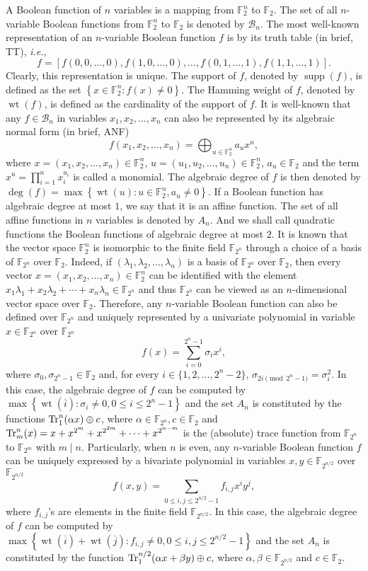 \documentclass{article}
\newcommand{\F}{\mathbb{F}}
\newcommand{\0}{\textbf{0}}
\newcommand{\1}{\textbf{1}}
\newcommand{\wt}{\operatorname{wt}}
\theoremstyle{plain}
\begin{document}
    A Boolean function of $n$ variables is a mapping from $\F_2^n$ to $\F_2$.
    The set of all $n$-variable Boolean functions from $\F_2^n$ to $\F_2$ is denoted by $\mathcal{B}_n$.
    The most well-known representation of an $n$-variable Boolean function $f$ is by its truth table (in brief, TT), \emph{i.e.},
    \[f=\left[ f(0,0,\dots,0),f(1,0,\dots,0),\dots,f(0,1,\dots,1),f(1,1,\dots,1) \right].\]
    Clearly, this representation is unique.
    The support of $f$, denoted by $\operatorname{supp}(f)$, is defined as the set $\left\{ x\in\F_2^n : f(x)\ne 0 \right\}$.
    The Hamming weight of $f$, denoted by $\wt(f)$, is defined as the cardinality of the support of $f$.
    It is well-known that any $f\in\mathcal{B}_n$ in variables $x_1,x_2,\dots,x_n$ can also be represented by its algebraic normal form (in brief, ANF)
    \[f(x_1,x_2,\dots,x_n) = \bigoplus_{u\in\F_2^n}a_ux^u,\]
    where $x=(x_1,x_2,\dots,x_n)\in\F_2^n$, $u=(u_1,u_2,\dots,u_n)\in\F_2^n$, $a_u\in\F_2$ and the term $x^{u}=\prod_{i=1}^nx_i^{u_i}$ is called a monomial.
    The algebraic degree of $f$ is then denoted by $\deg(f)=\max\left\{ \wt(u) :  u\in\F_2^n, a_u\ne 0 \right\}$.
    If a Boolean function has algebraic degree at most $1$, we say that it is an affine function.
    The set of all affine functions in $n$ variables is denoted by $A_n$.
    And we shall call quadratic functions the Boolean functions of algebraic degree at most $2$.
    It is known that the vector space $\F_2^n$ is isomorphic to the finite field $\F_{2^n}$ through a choice of a basis of $\F_{2^n}$ over $\F_2$.
    Indeed, if $(\lambda_1,\lambda_2,\dots,\lambda_n)$ is a basis of $\F_{2^n}$ over $\F_2$, then every vector $x=(x_1,x_2,\dots,x_n)\in\F_2^n$ can be
    identified with the element $x_1\lambda_1+x_2\lambda_2+\cdots+x_n\lambda_n\in\F_{2^n}$ and thus $\F_{2^n}$ can be viewed as an $n$-dimensional vector space over $\F_2$.
    Therefore, any $n$-variable Boolean function can also be defined over $\F_{2^n}$ and uniquely represented by a univariate polynomial in variable $x\in\F_{2^n}$ over $\F_{2^n}$
    \[f(x) = \sum_{i=0}^{2^n-1}\sigma_ix^i,\]
    where $\sigma_0,\sigma_{2^n-1}\in\F_2$ and, for every $i\in\{1,2,\dots,2^n-2\}$, $\sigma_{2i\pmod{2^n-1}}=\sigma_i^2$.
    In this case, the algebraic degree of $f$ can be computed by $\max\left\{ \wt(\overline{i}) : \sigma_i\ne 0, 0\le i\le 2^n-1 \right\}$ and the set $A_n$ is constituted by the functions $\Tr_1^n(\alpha x)\oplus c$, where $\alpha\in\F_{2^n}, c\in\F_2$ and $ \Tr_m^n(x)=x+x^{2^m}+x^{2^{2m}}+\cdots+x^{2^{n-m}}$ is the (absolute) trace function from $\F_{2^n}$ to $\F_{2^m}$ with $m\mid n$.
    Particularly, when $n$ is even, any $n$-variable Boolean function $f$ can be uniquely expressed by a bivariate polynomial in variables $x,y\in\F_{2^{n/2}}$ over $\F_{2^{n/2}}$
    \[f(x,y)=\sum_{0\le i,j\le 2^{n/2}-1}f_{i,j}x^iy^j,\]
    where $f_{i,j}$'s are elements in the finite field $\F_{2^{n/2}}$.
    In this case, the algebraic degree of $f$ can be computed by $\max\left\{ \wt(\overline{i})+\wt(\overline{j}) : f_{i,j}\ne 0, 0\le i,j\le 2^{n/2}-1 \right\}$ and the set $A_n$ is constituted by the function $\Tr_1^{n/2}(\alpha x+\beta y)\oplus c$, where $\alpha,\beta\in\F_{2^{n/2}}$ and $c\in\F_2$.
\end{document}
